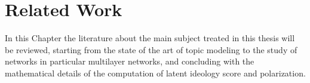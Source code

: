
\chapter{Related Work}%
\label{Ch:related}

\ifpdf
    \graphicspath{{Chapter2/Figs/Raster/}{Chapter2/Figs/PDF/}{Chapter2/Figs/}}
\else
    \graphicspath{{Chapter2/Figs/Vector/}{Chapter2/Figs/}}
\fi

In this Chapter  the literature about the main subject treated in this thesis will be reviewed, starting from the state of the art of topic modeling to the study of networks in particular multilayer networks, and concluding with the mathematical details of the computation of latent ideology score and polarization.










